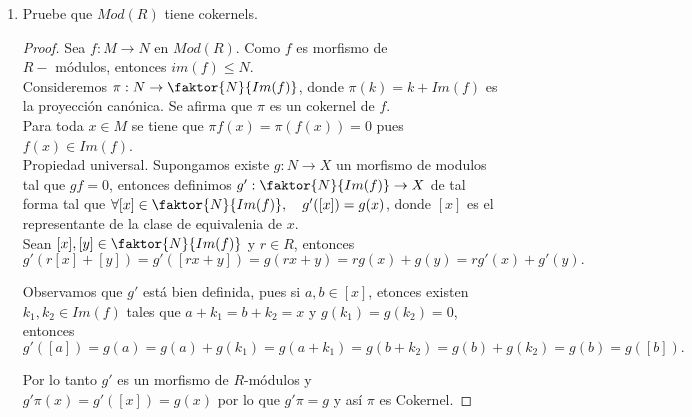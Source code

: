 \documentclass{article}
\begin{document}
\begin{enumerate}[label=\textbf{Ej \arabic*.}]
\begin{proof}
Por lo tanto $Mod(R)$ tiene kernels.

\end{proof}

\item Pruebe que $Mod(R)$ tiene cokernels.

\begin{proof}
Sea $f:M\to N$ en $Mod(R)$. Como $f$ es morfismo de \\ $R-$ módulos, entonces $im(f)\leq N$. \\

Consideremos $\pi:N\to \faktor{N}{Im(f)}$, donde $\pi(k)=k+Im(f)$ es la proyección canónica. Se afirma que $\pi$ es un cokernel de $f$.\\

 Para toda $x\in M$ se tiene que $\pi f(x)=\pi(f(x))=0$ pues $f(x)\in Im(f)$.\\

 Propiedad universal. Supongamos existe $g:N\to X$ un morfismo de modulos tal que $gf=0$, entonces definimos 
$g':\faktor{N}{Im(f)}\to X$ de tal forma tal que $\forall [x]\in \faktor{N}{Im(f)},\quad g'([x])=g(x)$, donde $[x]$ es el representante de
la clase de equivalenia de $x$.\\

Sean $[x],[y]\in \faktor{N}{Im(f)}$ y $r\in R$, entonces 
\[g'(r[x]+[y])=g'([rx+y])=g(rx+y)=rg(x)+g(y)=rg'(x)+g'(y).\]

Observamos que $g'$ está bien definida, pues si $a,b\in [x]$, etonces existen $k_1,k_2\in Im(f)$ tales que $a+k_1=b+k_2=x$ y $g(k_1)=g(k_2)=0$,
entonces 
\[g'([a])=g(a)=g(a)+g(k_1)=g(a+k_1)=g(b+k_2)=g(b)+g(k_2)=g(b)=g([b]).\]

Por lo tanto $g'$ es un morfismo de $R$-módulos y $g'\pi(x)=g'([x])=g(x)$ por lo que $g'\pi=g$ y así $\pi$ es Cokernel.









\end{proof}








	\end{enumerate}		
\end{document}
